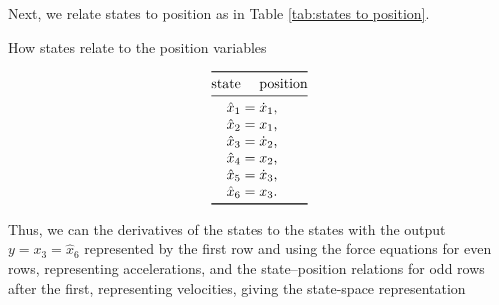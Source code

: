 \documentclass[12pt]{article}
\begin{document}
Next, we relate states to position as in Table \ref{tab:states to position}.

\begin{table}[h]
    \centering
    \caption{How states relate to the position variables}
    \[
        \begin{array}{@{}r@{}c@{}l@{}}
        \toprule
            \text{state} & & \text{position}
        \\*
        \midrule
            {\hat{x}}_1 &{}={}& \dot{x}_1\rlap,
        \\*
            {\hat{x}}_2 &{}={}& x_1\rlap,
        \\*
            {\hat{x}}_3 &{}={}& \dot{x}_2\rlap,
        \\*
            {\hat{x}}_4 &{}={}& x_2\rlap,
        \\*
            {\hat{x}}_5 &{}={}& \dot{x}_3\rlap,
        \\*
            {\hat{x}}_6 &{}={}& x_3\rlap.
        \\*
        \bottomrule
        \end{array}
    \]
    \label{tab:states to position}
\end{table}

Thus, we can the derivatives of the states to the states with
the output $y = x_3 = {\hat{x}}_6$ represented by the first row
and using
the force equations for even rows, representing accelerations,
and the state--position relations for odd rows after the first, representing velocities,
giving the state-space representation
\end{document}
